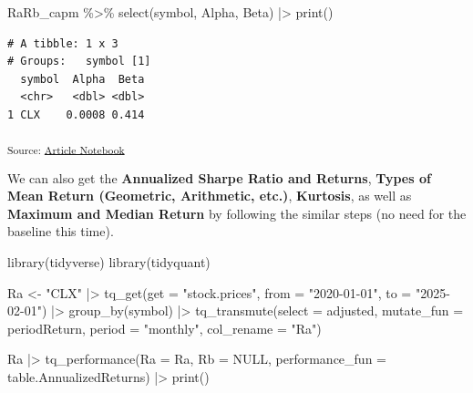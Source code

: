 \documentclass[
  letterpaper,
  DIV=11,
  numbers=noendperiod]{scrartcl}
\newenvironment{Shaded}{\begin{snugshade}}{\end{snugshade}}
\newcommand{\AttributeTok}[1]{\textcolor[rgb]{0.40,0.45,0.13}{#1}}
\newcommand{\ConstantTok}[1]{\textcolor[rgb]{0.56,0.35,0.01}{#1}}
\newcommand{\FunctionTok}[1]{\textcolor[rgb]{0.28,0.35,0.67}{#1}}
\newcommand{\NormalTok}[1]{\textcolor[rgb]{0.00,0.23,0.31}{#1}}
\newcommand{\OtherTok}[1]{\textcolor[rgb]{0.00,0.23,0.31}{#1}}
\newcommand{\SpecialCharTok}[1]{\textcolor[rgb]{0.37,0.37,0.37}{#1}}
\newcommand{\StringTok}[1]{\textcolor[rgb]{0.13,0.47,0.30}{#1}}
\begin{document}
\begin{Shaded}
\begin{Highlighting}[]
\NormalTok{RaRb\_capm }\SpecialCharTok{\%\textgreater{}\%} \FunctionTok{select}\NormalTok{(symbol, Alpha, Beta) }\SpecialCharTok{|\textgreater{}} \FunctionTok{print}\NormalTok{()}
\end{Highlighting}
\end{Shaded}

\begin{verbatim}
# A tibble: 1 x 3
# Groups:   symbol [1]
  symbol  Alpha  Beta
  <chr>   <dbl> <dbl>
1 CLX    0.0008 0.414
\end{verbatim}

\textsubscript{Source:
\href{https://ds-an.github.io/computational-finance-project/index.qmd.html}{Article
Notebook}}

We can also get the \textbf{Annualized Sharpe Ratio and Returns},
\textbf{Types of Mean Return (Geometric, Arithmetic, etc.)},
\textbf{Kurtosis}, as well as \textbf{Maximum and Median Return} by
following the similar steps (no need for the baseline this time).

\begin{Shaded}
\begin{Highlighting}[]
\FunctionTok{library}\NormalTok{(tidyverse)}
\FunctionTok{library}\NormalTok{(tidyquant)}

\NormalTok{Ra }\OtherTok{\textless{}{-}} \StringTok{"CLX"} \SpecialCharTok{|\textgreater{}}
    \FunctionTok{tq\_get}\NormalTok{(}\AttributeTok{get  =} \StringTok{"stock.prices"}\NormalTok{,}
           \AttributeTok{from =} \StringTok{"2020{-}01{-}01"}\NormalTok{,}
           \AttributeTok{to   =} \StringTok{"2025{-}02{-}01"}\NormalTok{) }\SpecialCharTok{|\textgreater{}}
    \FunctionTok{group\_by}\NormalTok{(symbol) }\SpecialCharTok{|\textgreater{}}
    \FunctionTok{tq\_transmute}\NormalTok{(}\AttributeTok{select     =}\NormalTok{ adjusted, }
                 \AttributeTok{mutate\_fun =}\NormalTok{ periodReturn, }
                 \AttributeTok{period     =} \StringTok{"monthly"}\NormalTok{, }
                 \AttributeTok{col\_rename =} \StringTok{"Ra"}\NormalTok{)}

\NormalTok{Ra }\SpecialCharTok{|\textgreater{}}
  \FunctionTok{tq\_performance}\NormalTok{(}\AttributeTok{Ra =}\NormalTok{ Ra, }\AttributeTok{Rb =} \ConstantTok{NULL}\NormalTok{, }\AttributeTok{performance\_fun =}\NormalTok{ table.AnnualizedReturns) }\SpecialCharTok{|\textgreater{}}
  \FunctionTok{print}\NormalTok{()}
\end{Highlighting}
\end{Shaded}
\end{document}
